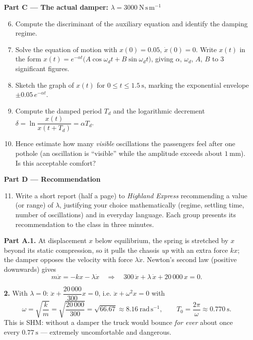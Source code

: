 \documentclass[11pt]{article}
\newcounter{popsec}
\newcounter{popsub}
\newcommand{\courssub}[1]{%
  \stepcounter{popsub}%
  \par\vspace{9pt}\noindent{\popxbold\fontsize{11.5}{13}\selectfont\color{popink}{\color{poporange}\thepopsec.\thepopsub}\hspace{6pt}#1}\par\nopagebreak\vspace{4pt}
}
\begin{document}
\textbf{Part C --- The actual damper: $\lambda = 3000\ \mathrm{N\,s\,m^{-1}}$}

\begin{enumerate}
\setcounter{enumi}{5}
\item Compute the discriminant of the auxiliary equation and identify the damping regime.
\item Solve the equation of motion with $x(0)=0.05$, $\dot{x}(0)=0$. Write $x(t)$ in the form $x(t)=e^{-\alpha t}\bigl(A\cos\omega_d t+B\sin\omega_d t\bigr)$, giving $\alpha$, $\omega_d$, $A$, $B$ to 3 significant figures.
\item Sketch the graph of $x(t)$ for $0\le t\le 1.5\ \mathrm{s}$, marking the exponential envelope $\pm 0.05\,e^{-\alpha t}$.
\item Compute the damped period $T_d$ and the logarithmic decrement $\delta=\ln\dfrac{x(t)}{x(t+T_d)}=\alpha T_d$.
\item Hence estimate how many \emph{visible} oscillations the passengers feel after one pothole (an oscillation is ``visible'' while the amplitude exceeds about $1\ \mathrm{mm}$). Is this acceptable comfort?
\end{enumerate}

\textbf{Part D --- Recommendation}

\begin{enumerate}
\setcounter{enumi}{10}
\item Write a short report (half a page) to \emph{Highland Express} recommending a value (or range) of $\lambda$, justifying your choice mathematically (regime, settling time, number of oscillations) and in everyday language. Each group presents its recommendation to the class in three minutes.
\end{enumerate}

\courssub{Model answer}

\textbf{Part A.}\quad \textbf{1.} At displacement $x$ below equilibrium, the spring is stretched by $x$ beyond its static compression, so it pulls the chassis \emph{up} with an extra force $kx$; the damper opposes the velocity with force $\lambda\dot{x}$. Newton's second law (positive downwards) gives
\[ m\ddot{x}=-kx-\lambda\dot{x}\quad\Longrightarrow\quad 300\,\ddot{x}+\lambda\,\dot{x}+20\,000\,x=0. \]

\textbf{2.} With $\lambda=0$: $\ddot{x}+\dfrac{20\,000}{300}x=0$, i.e. $\ddot{x}+\omega^2 x=0$ with
\[ \omega=\sqrt{\frac{k}{m}}=\sqrt{\frac{20\,000}{300}}=\sqrt{66.67}\approx 8.16\ \mathrm{rad\,s^{-1}},\qquad
T_0=\frac{2\pi}{\omega}\approx 0.770\ \mathrm{s}. \]
This is SHM: without a damper the truck would bounce \emph{for ever} about once every $0.77\ \mathrm{s}$ --- extremely uncomfortable and dangerous.
\end{document}

